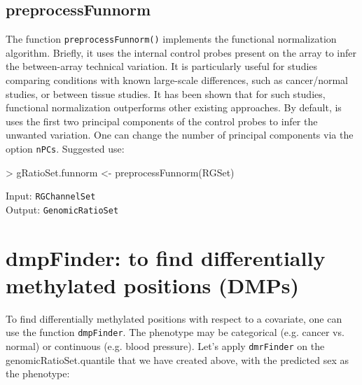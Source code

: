 \documentclass[12pt]{article}
\newcommand{\Rcode}[1]{{\texttt{#1}}}
\begin{document}
\subsection*{preprocessFunnorm}
The function \Rcode{preprocessFunnorm()} implements the functional normalization algorithm. Briefly, it uses the internal control probes present on the array to infer the between-array technical variation. It is particularly useful for studies comparing conditions with known large-scale differences, such as cancer/normal studies, or between tissue studies. It has been shown that for such studies, functional normalization outperforms other existing approaches. By default, is uses the first two principal components of the control probes to infer the unwanted variation. One can change the number of principal components via the option \Rcode{nPCs}. Suggested use: 
\begin{Schunk}
\begin{Sinput}
> gRatioSet.funnorm <- preprocessFunnorm(RGSet)
\end{Sinput}
\end{Schunk}
Input: \Rcode{RGChannelSet}\\
Output: \Rcode{GenomicRatioSet}

\section{dmpFinder: to find differentially methylated positions (DMPs)}
To find differentially methylated positions with respect to a covariate, one can use the function \texttt{dmpFinder}. The phenotype may be categorical (e.g. cancer vs. normal) or continuous (e.g. blood pressure). Let's apply \texttt{dmrFinder} on the genomicRatioSet.quantile that we have created above, with the predicted sex as the phenotype: 
\begin{Schunk}
\end{Schunk}
\end{document}
